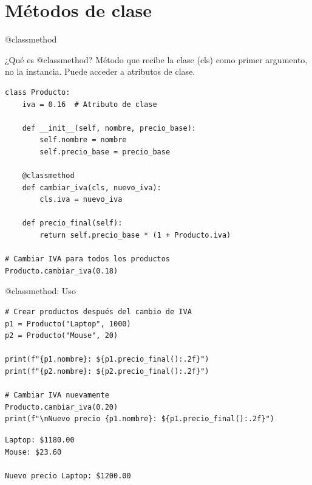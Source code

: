 \documentclass{beamer}
\begin{document}
\section{Métodos de clase}

\begin{frame}[fragile]{@classmethod \faLayerGroup}
\begin{conceptbox}{¿Qué es @classmethod?}
Método que recibe la clase (cls) como primer argumento, no la instancia. Puede acceder a atributos de clase.
\end{conceptbox}

\begin{lstlisting}
class Producto:
    iva = 0.16  # Atributo de clase
    
    def __init__(self, nombre, precio_base):
        self.nombre = nombre
        self.precio_base = precio_base
    
    @classmethod
    def cambiar_iva(cls, nuevo_iva):
        cls.iva = nuevo_iva
    
    def precio_final(self):
        return self.precio_base * (1 + Producto.iva)

# Cambiar IVA para todos los productos
Producto.cambiar_iva(0.18)
\end{lstlisting}
\end{frame}

\begin{frame}[fragile]{@classmethod: Uso \faTag}
\begin{lstlisting}
# Crear productos después del cambio de IVA
p1 = Producto("Laptop", 1000)
p2 = Producto("Mouse", 20)

print(f"{p1.nombre}: ${p1.precio_final():.2f}")
print(f"{p2.nombre}: ${p2.precio_final():.2f}")

# Cambiar IVA nuevamente
Producto.cambiar_iva(0.20)
print(f"\nNuevo precio {p1.nombre}: ${p1.precio_final():.2f}")
\end{lstlisting}

\vspace{-0.2cm}
\begin{tcolorbox}[colback=green!10,colframe=green,title={\small\faArrowCircleRight \ Salida},coltitle=fg0,left=3pt,right=3pt,top=3pt,bottom=3pt,boxsep=2pt]
\small\texttt{Laptop: \$1180.00\\
Mouse: \$23.60\\
\ \\
Nuevo precio Laptop: \$1200.00}
\end{tcolorbox}
\end{frame}
\end{document}
